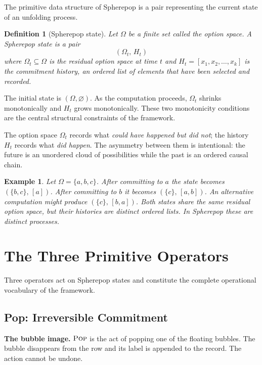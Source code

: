 \documentclass[12pt]{article}
\newtheorem{definition}{Definition}[section]
\newtheorem{example}{Example}[section]
\newcommand{\Pop}{\operatorname{\textsc{Pop}}}
\newcommand{\Option}{\Omega}
\newcommand{\Seq}[1]{\left[#1\right]}
\begin{document}
The primitive data structure of Spherepop is a pair representing the current state of an unfolding process.

\begin{definition}[Spherepop state]
\label{def:state}
Let $\Option$ be a finite set called the \emph{option space}. A \emph{Spherepop state} is a pair
\[
(\Option_t,\, H_t)
\]
where $\Option_t \subseteq \Option$ is the \emph{residual option space} at time $t$ and $H_t = \Seq{x_1, x_2, \ldots, x_k}$ is the \emph{commitment history}, an ordered list of elements that have been selected and recorded.
\end{definition}

The initial state is $(\Option, \varnothing)$. As the computation proceeds, $\Option_t$ shrinks monotonically and $H_t$ grows monotonically. These two monotonicity conditions are the central structural constraints of the framework.

The option space $\Option_t$ records what \emph{could have happened but did not}; the history $H_t$ records what \emph{did happen}. The asymmetry between them is intentional: the future is an unordered cloud of possibilities while the past is an ordered causal chain.

\begin{example}
Let $\Option = \{a, b, c\}$. After committing to $a$ the state becomes $(\{b,c\},\, \Seq{a})$. After committing to $b$ it becomes $(\{c\},\, \Seq{a,b})$. An alternative computation might produce $(\{c\},\, \Seq{b,a})$. Both states share the same residual option space, but their histories are distinct ordered lists. In Spherepop these are distinct processes.
\end{example}

\section{The Three Primitive Operators}
\label{sec:operators}

Three operators act on Spherepop states and constitute the complete operational vocabulary of the framework.

\subsection{Pop: Irreversible Commitment}

\medskip\noindent\textbf{The bubble image.} $\Pop$ is the act of popping one of the floating bubbles. The bubble disappears from the row and its label is appended to the record. The action cannot be undone.\medskip
\end{document}
